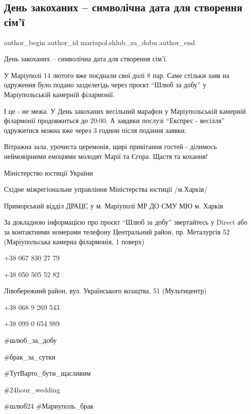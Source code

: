  
 
 
 
 

\subsection{День закоханих – символічна дата для створення сім'ї}
\label{sec:14_02_2022.fb.mariupol.shlub_za_dobu.1.den_zakohanyh_symvolichna_data_stvorennja_simji}

\ifcmt
 author_begin
   author_id mariupol.shlub_za_dobu
 author_end
\fi

День закоханих – символічна дата для створення сім'ї.

У Маріуполі 14 лютого вже поєднали свої долі 8 пар. Саме стільки заяв на
одруження було подано зазделегідь через проєкт \enquote{Шлюб за добу} у Маріупольській
камерній філармонії.

І це - не межа. У День закоханих  весільний марафон у Маріупольській камерній
філармонії продовжиться до 20:00. А завдяки послузі \enquote{Експрес - весілля}
одружитися можна вже через 3 години після подання заявки.

Вітражна зала, урочиста церемонія, щирі привітання гостей - ділимось  неймовірними емоціями молодят Марії та Єгора. Щастя та кохання!

Міністерство юстиції України 

Східне міжрегіональне управління Міністерства юстиції /м.Харків/ 

Приморський відділ ДРАЦС у м. Маріуполі МР ДО СМУ МЮ м. Харків

За докладною інформацією про проєкт \enquote{Шлюб за добу} звертайтесь у Direct або за контактними номерами телефону 
Центральний район, пр. Металургів 52 (Маріупольська камерна філармонія, 1 поверх)

+38 067 830 27 79 \par
+38 050 505 52 82\par

Лівобережний район, вул. Українського козацтва, 51 (Мультицентр)

+38 068 9 269 543\par
+38 099 0 654 989\par

\#шлюб\_за\_добу 

\#брак\_за\_сутки

\#ТутВарто\_бути\_щасливим 

\#24hour\_wedding 

\#шлюб24 \#Мариуполь\_брак
